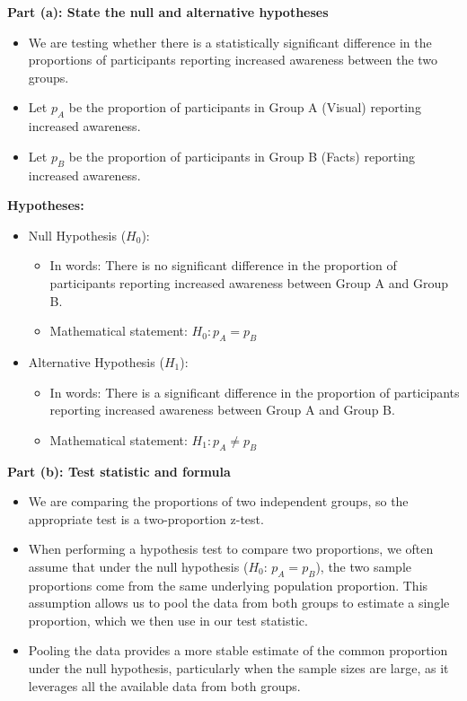 \documentclass{article}
\begin{document}
\textbf{Part (a): State the null and alternative hypotheses}

\begin{itemize}
    \item We are testing whether there is a statistically significant difference in the proportions of participants reporting increased awareness between the two groups.
    \item Let \( p_A \) be the proportion of participants in Group A (Visual) reporting increased awareness.
    \item Let \( p_B \) be the proportion of participants in Group B (Facts) reporting increased awareness.
\end{itemize}

\textbf{Hypotheses:}
\begin{itemize}
    \item Null Hypothesis (\( H_0 \)):
    \begin{itemize}
        \item In words: There is no significant difference in the proportion of participants reporting increased awareness between Group A and Group B.
        \item Mathematical statement: \( H_0: p_A = p_B \)
    \end{itemize}

    \item Alternative Hypothesis (\( H_1 \)):
    \begin{itemize}
        \item In words: There is a significant difference in the proportion of participants reporting increased awareness between Group A and Group B.
        \item Mathematical statement: \( H_1: p_A \neq p_B \)
    \end{itemize}
\end{itemize}

\textbf{Part (b): Test statistic and formula}

\begin{itemize}
    \item We are comparing the proportions of two independent groups, so the appropriate test is a two-proportion z-test.
    \item When performing a hypothesis test to compare two proportions, we often assume that under the null hypothesis (\( H_0 \): \( p_A = p_B \)), the two sample proportions come from the same underlying population proportion. This assumption allows us to pool the data from both groups to estimate a single proportion, which we then use in our test statistic.
    \item Pooling the data provides a more stable estimate of the common proportion under the null hypothesis, particularly when the sample sizes are large, as it leverages all the available data from both groups.
\end{itemize}
\end{document}
